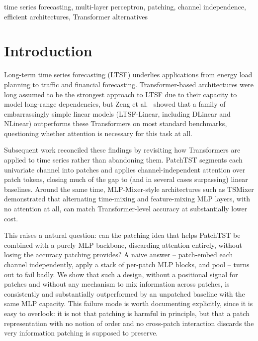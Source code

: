 \documentclass[conference]{IEEEtran}
\begin{document}
\begin{IEEEkeywords}
time series forecasting, multi-layer perceptron, patching, channel independence,
efficient architectures, Transformer alternatives
\end{IEEEkeywords}

\section{Introduction}

Long-term time series forecasting (LTSF) underlies applications from energy load
planning to traffic and financial forecasting. Transformer-based architectures
\cite{zhou2021informer,wu2021autoformer,zhou2022fedformer} were long assumed to be
the strongest approach to LTSF due to their capacity to model long-range
dependencies, but Zeng et al.\ \cite{zeng2023transformers} showed that a family of
embarrassingly simple linear models (LTSF-Linear, including DLinear and NLinear)
outperforms these Transformers on most standard benchmarks, questioning whether
attention is necessary for this task at all.

Subsequent work reconciled these findings by revisiting how Transformers are applied
to time series rather than abandoning them. PatchTST \cite{nie2023patchtst}
segments each univariate channel into patches and applies channel-independent
attention over patch tokens, closing much of the gap to (and in several cases
surpassing) linear baselines. Around the same time, MLP-Mixer-style architectures
such as TSMixer \cite{chen2023tsmixer} demonstrated that alternating time-mixing and
feature-mixing MLP layers, with no attention at all, can match Transformer-level
accuracy at substantially lower cost.

This raises a natural question: can the patching idea that helps PatchTST be
combined with a purely MLP backbone, discarding attention entirely, without losing
the accuracy patching provides? A naive answer -- patch-embed each channel
independently, apply a stack of per-patch MLP blocks, and pool -- turns out to fail
badly. We show that such a design, without a positional signal for patches and
without any mechanism to mix information across patches, is consistently and
substantially outperformed by an unpatched baseline with the same MLP capacity. This
failure mode is worth documenting explicitly, since it is easy to overlook: it is not
that patching is harmful in principle, but that a patch representation with no
notion of order and no cross-patch interaction discards the very information
patching is supposed to preserve.
\end{document}
